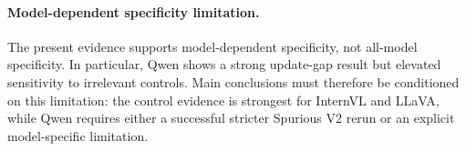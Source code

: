 \paragraph{Model-dependent specificity limitation.}
The present evidence supports model-dependent specificity, not all-model specificity. In particular, Qwen shows a strong update-gap result but elevated sensitivity to irrelevant controls. Main conclusions must therefore be conditioned on this limitation: the control evidence is strongest for InternVL and LLaVA, while Qwen requires either a successful stricter Spurious V2 rerun or an explicit model-specific limitation.
